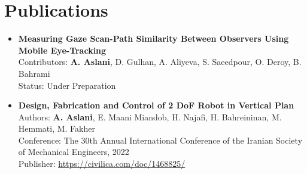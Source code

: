 \documentclass[a4paper,12pt]{article}
\begin{document}

\section{Publications}

\begin{itemize}
    \item \textbf{Measuring Gaze Scan-Path Similarity Between Observers Using Mobile Eye-Tracking}\\
    Contributors: \textbf{A. Aslani}, D. Gulhan, A. Aliyeva, S. Saeedpour, O. Deroy, B. Bahrami\\
    Status: Under Preparation
\end{itemize}


\begin{itemize}
    \item \textbf{Design, Fabrication and Control of 2 DoF Robot in Vertical Plan}\\
    Authors: \textbf{A. Aslani}, E. Maani Miandob, H. Najafi, H. Bahreininan, M. Hemmati, M. Fakher\\
    Conference: The 30th Annual International Conference of the Iranian Society of Mechanical Engineers, 2022\\
    Publisher:  \href{https://civilica.com/doc/1468825/}{https://civilica.com/doc/1468825/}
\end{itemize}








\end{document}
